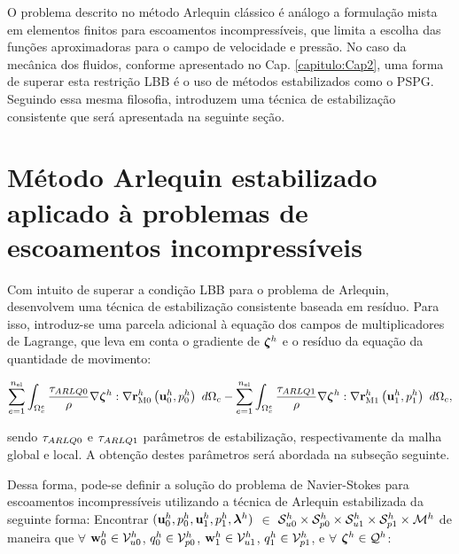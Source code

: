 \documentclass[tese_patricia]{subfiles}
\begin{document}
O problema descrito no método Arlequin clássico é análogo a formulação mista em elementos finitos para escoamentos incompressíveis, que limita a escolha das funções aproximadoras para o campo de velocidade e pressão. No caso da mecânica dos fluidos, conforme apresentado no Cap. \ref{capitulo:Cap2}, uma forma de superar esta restrição LBB é o uso de métodos estabilizados como o PSPG. Seguindo essa mesma filosofia,   introduzem uma técnica de estabilização consistente que será apresentada na seguinte seção. 

\section{Método Arlequin estabilizado aplicado à problemas de escoamentos incompressíveis}


Com intuito de superar a condição LBB para o problema de Arlequin,  desenvolvem uma técnica de estabilização consistente baseada em resíduo. Para isso, introduz-se uma parcela adicional à equação dos campos de multiplicadores de Lagrange, que leva em conta o gradiente de $\boldsymbol{\zeta}^h$ e o resíduo da equação da quantidade de movimento:

\begin{align}
	\sum_{e=1}^{n_{\mathrm{el}}} \int_{\Omega^e_{c}} \frac{\tau_{ARLQ0}}{\rho} \nabla \boldsymbol{\zeta}^h : \nabla \mathbf{r}_{\mathrm{M0}}^{h}\left(\mathbf{u}_0^h,p_0^h \right) \ d\Omega_{c} - 
	\sum_{e=1}^{n_{\mathrm{el}}} \int_{\Omega^e_{c}} \frac{\tau_{ARLQ1}}{\rho} \nabla \boldsymbol{\zeta}^h : \nabla \mathbf{r}_{\mathrm{M1}}^{h}\left(\mathbf{u}_1^h,p_1^h \right) \ d\Omega_{c},
\end{align}

\noindent sendo $\tau_{ARLQ0}$ e $\tau_{ARLQ1}$ parâmetros de estabilização, respectivamente da malha global e local. A obtenção destes parâmetros será abordada na subseção seguinte. 

Dessa forma, pode-se definir a solução do problema de Navier-Stokes para escoamentos incompressíveis utilizando a técnica de Arlequin estabilizada da seguinte forma: Encontrar $(\mathbf{u}_0^h,p_0^h,\mathbf{u}_1^h,p_1^h,\boldsymbol{\lambda}^h)$ $\in$ $\mathcal{S}_{u0}^h \times \mathcal{S}_{p0}^h \times \mathcal{S}_{u1}^h \times \mathcal{S}_{p1}^h \times \mathcal{M}^h$ de maneira que  $\forall$ $\mathbf{w}_0^h \in \mathcal{V}_{u0}^h$, $q_0^h \in \mathcal{V}_{p0}^h$, $\mathbf{w}_1^h \in \mathcal{V}_{u1}^h$, $q_1^h \in \mathcal{V}_{p1}^h$,   e $\forall$ $\boldsymbol{\zeta}^h \in \mathcal{Q}^h$:
\end{document}
